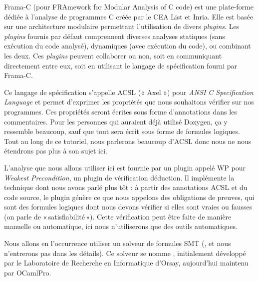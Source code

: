 





Frama-C (pour FRAmework for Modular Analysis of C code) est une plate-forme
 dédiée à l'analyse de programmes C créée par le CEA List et Inria. Elle est
 basée sur une architecture modulaire permettant l'utilisation de divers
 \textit{plugins}. Les \textit{plugins} fournis par défaut comprennent diverses
 analyses statiques (sans exécution du code analysé), dynamiques (avec
 exécution du code), ou combinant les deux. Ces \textit{plugins} peuvent collaborer
 ou non, soit en communiquant directement entre eux, soit en utilisant le
 langage de spécification fourni par Frama-C.



Ce langage de spécification s'appelle ACSL (« Axel »)
pour \textit{ANSI C Specification Language} et permet d'exprimer les
propriétés que nous souhaitons vérifier sur nos programmes. Ces propriétés seront
écrites sous forme d'annotations dans les commentaires. Pour les personnes qui
auraient déjà utilisé Doxygen, ça y ressemble beaucoup, sauf que tout sera
écrit sous forme de formules logiques. Tout au long de ce tutoriel, nous parlerons
beaucoup d'ACSL donc nous ne nous étendrons pas plus à son sujet ici.



L'analyse que nous allons utiliser ici est fournie par un plugin appelé WP pour
\textit{Weakest Precondition}, un plugin de vérification déduction. Il implémente
la technique dont nous avons parlé plus tôt :
à partir des annotations ACSL et du code source, le plugin génère ce que nous
appelons des obligations de preuves, qui sont des formules logiques dont nous
devons vérifier si elles sont vraies ou fausses (on parle de « satisfiabilité »).
Cette vérification peut être faite de manière
manuelle ou automatique, ici nous n'utiliserons que des outils automatiques.



Nous allons en l'occurrence utiliser un solveur de formules SMT
(,
et nous n'entrerons pas dans les détails). Ce solveur se nomme
, initialement développé par le Laboratoire
de Recherche en Informatique d'Orsay, aujourd'hui maintenu par
OCamlPro.





